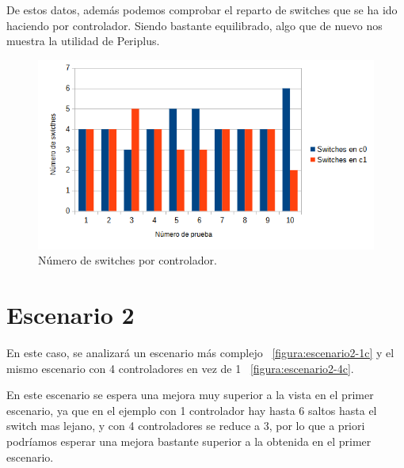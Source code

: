 \documentclass[a4paper, 12pt]{book}
\begin{document}
 	De estos datos, además podemos comprobar el reparto de switches que se ha ido haciendo por controlador. Siendo bastante equilibrado, algo que de nuevo nos muestra la utilidad de Periplus.
 	
 	\begin{figure}[H]
 		\centering
 		\includegraphics[width=16cm, keepaspectratio]{img/switchesporcontrollerescenario1}
 		\caption{Número de switches por controlador.}
 		\label{figura:switchesporcontrollerescenario1}
 	\end{figure}
 	
 	
 	
 	\clearpage
 	\section{Escenario 2}
 	
 	En este caso, se analizará un escenario más complejo ~\ref{figura:escenario2-1c} y el mismo escenario con 4 controladores en vez de 1 ~\ref{figura:escenario2-4c}.
 	
 	En este escenario se espera una mejora muy superior a la vista en el primer escenario, ya que en el ejemplo con 1 controlador hay hasta 6 saltos hasta el switch mas lejano, y con 4 controladores se reduce a 3, por lo que a priori podríamos esperar una mejora bastante superior a la obtenida en el primer escenario.
 	
\end{document}
